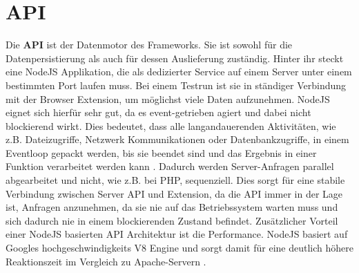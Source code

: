 %
%
%
%


\section{API}

Die \textbf{API} ist der Datenmotor des Frameworks. Sie ist sowohl für die Datenpersistierung als auch für dessen Auslieferung zuständig. Hinter ihr steckt eine NodeJS Applikation, die als dedizierter Service auf einem Server unter einem bestimmten Port laufen muss. Bei einem Testrun ist sie in ständiger Verbindung mit der Browser Extension, um möglichst viele Daten aufzunehmen. NodeJS eignet sich hierfür sehr gut, da es event-getrieben agiert und dabei nicht blockierend wirkt. Dies bedeutet, dass alle langandauerenden Aktivitäten, wie z.B. Dateizugriffe, Netzwerk Kommunikationen oder Datenbankzugriffe, in einem Eventloop gepackt werden, bis sie beendet sind und das Ergebnis in einer Funktion verarbeitet werden kann \cite{nonblocking}. Dadurch werden Server-Anfragen parallel abgearbeitet und nicht, wie z.B. bei PHP, sequenziell. Dies sorgt für eine stabile Verbindung zwischen Server API und Extension, da die API immer in der Lage ist, Anfragen anzunehmen, da sie nie auf das Betriebssystem warten muss und sich dadurch nie in einem blockierenden Zustand befindet. Zusätzlicher Vorteil einer NodeJS basierten API Architektur ist die Performance. NodeJS basiert auf Googles hochgeschwindigkeits V8 Engine und sorgt damit für eine deutlich höhere Reaktionszeit im Vergleich zu Apache-Servern \cite{nodevsphp}.

